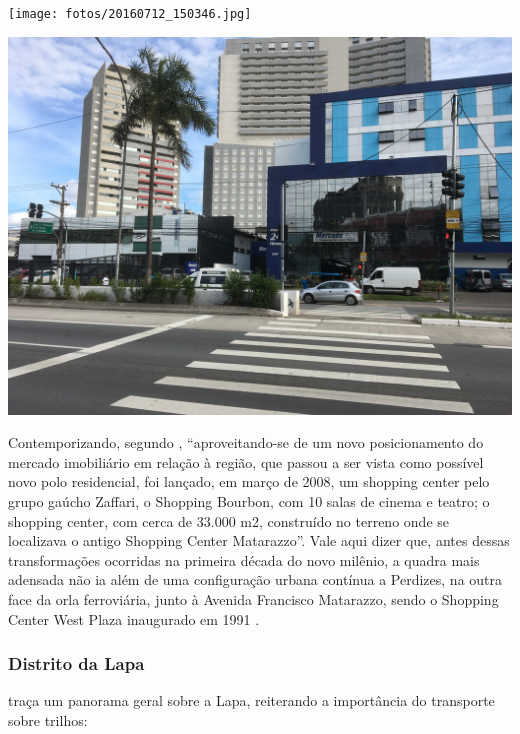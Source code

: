 	\noindent
	\begin{minipage}[b]{.4\textwidth}
		\texttt{[image: fotos/20160712\_150346.jpg]}
	\end{minipage}%
	\hfill
	\begin{minipage}[b]{.4\linewidth}
		\includegraphics[width=\textwidth]{fotos/2017_04_23_001.jpg}
	\end{minipage}
	
	Contemporizando, segundo , ``aproveitando-se de um novo posicionamento do mercado imobiliário em relação à região, que passou a ser vista como possível novo polo residencial, foi lançado, em março de 2008, um shopping center pelo grupo gaúcho Zaffari, o Shopping Bourbon, com 10 salas de cinema e teatro; o shopping center, com cerca de 33.000 m2, construído no terreno onde se localizava o antigo Shopping Center
	Matarazzo''. Vale aqui dizer que, antes dessas transformações ocorridas na primeira década do novo milênio, a quadra mais adensada não ia além de uma configuração urbana contínua a Perdizes, na outra face da orla ferroviária, junto à Avenida Francisco Matarazzo, sendo o Shopping Center West Plaza inaugurado em 1991 \cite[77]{Ottoni}.
	
	\subsubsection{Distrito da Lapa}
	
	 traça um panorama geral sobre a Lapa, reiterando a importância do transporte sobre trilhos:
	

